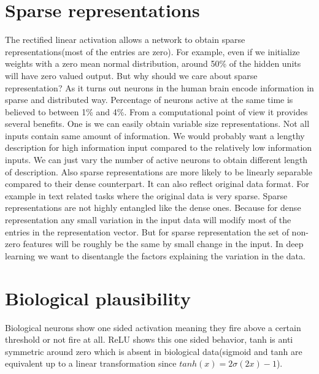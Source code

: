 \documentclass{article}
\begin{document}
\section*{Sparse representations}
The rectified linear activation allows a network to obtain sparse representations(most of the entries are zero). For example, even if we initialize weights with a zero mean normal distribution, around 50\% of the hidden units will have zero valued output. But why should we care about sparse representation? As it turns out neurons in the human brain encode information in sparse and distributed way. Percentage of neurons active at the same time is believed to between 1\% and 4\%. From a computational point of view it provides several benefits. One is we can easily obtain variable size representations. Not all inputs contain same amount of information. We would probably want a lengthy description for high information input compared to the relatively low information inputs. We can just vary the number of active neurons to obtain different length of description. Also sparse representations are more likely to be linearly separable compared to their dense counterpart. It can also reflect original data format. For example in text related tasks where the original data is very sparse. Sparse representations are not highly entangled like the dense ones. Because for dense representation any small variation in the input data will modify most of the entries in the representation vector. But for sparse representation the set of non-zero features will be roughly be the same by small change in the input. In deep learning we want to disentangle the factors explaining the variation in the data.  

\section*{Biological plausibility}
Biological neurons show one sided activation meaning they fire above a certain threshold or not fire at all. ReLU shows this one sided behavior, tanh is anti symmetric around zero which is absent in biological data(sigmoid and tanh are equivalent up to a linear transformation since $tanh(x) = 2\sigma (2x) - 1 $).  
\end{document}
